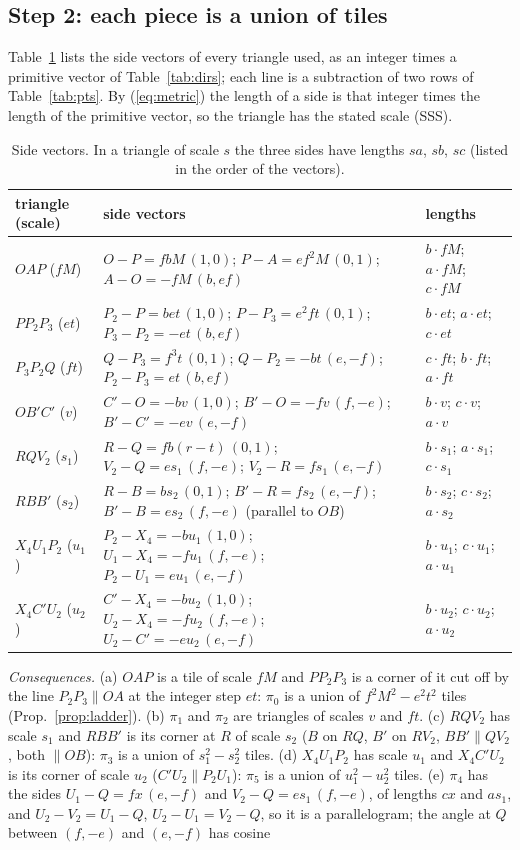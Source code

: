 \documentclass[11pt,reqno]{amsart}
\theoremstyle{plain}
\theoremstyle{definition}
\begin{document}
\subsection{Step 2: each piece is a union of tiles}\label{sub:shapes}
Table~\ref{tab:sides} lists the side vectors of every triangle used, as an integer times a primitive vector of Table~\ref{tab:dirs}; each line is a subtraction of two rows of Table~\ref{tab:pts}. By (\ref{eq:metric}) the length of a side is that integer times the length of the primitive vector, so the triangle has the stated scale (SSS).
\begin{table}[ht]
\centering\small
\caption{Side vectors. In a triangle of scale $s$ the three sides have lengths $sa$, $sb$, $sc$ (listed in the order of the vectors).}\label{tab:sides}
\begin{tabular}{@{}p{2.6cm}p{7.3cm}p{2.6cm}@{}}
\toprule
triangle (scale) & side vectors & lengths\\
\midrule
$OAP$ ($fM$) & $O-P=fbM\,(1,0)$; $P-A=ef^2M\,(0,1)$; $A-O=-fM\,(b,ef)$ & $b\!\cdot\! fM$; $a\!\cdot\! fM$; $c\!\cdot\! fM$\\
$PP_2P_3$ ($et$) & $P_2-P=bet\,(1,0)$; $P-P_3=e^2ft\,(0,1)$; $P_3-P_2=-et\,(b,ef)$ & $b\!\cdot\! et$; $a\!\cdot\! et$; $c\!\cdot\! et$\\
$P_3P_2Q$ ($ft$) & $Q-P_3=f^3t\,(0,1)$; $Q-P_2=-bt\,(e,-f)$; $P_2-P_3=et\,(b,ef)$ & $c\!\cdot\! ft$; $b\!\cdot\! ft$; $a\!\cdot\! ft$\\
$OB'C'$ ($v$) & $C'-O=-bv\,(1,0)$; $B'-O=-fv\,(f,-e)$; $B'-C'=-ev\,(e,-f)$ & $b\!\cdot\! v$; $c\!\cdot\! v$; $a\!\cdot\! v$\\
$RQV_2$ ($s_1$) & $R-Q=fb(r-t)\,(0,1)$; $V_2-Q=es_1\,(f,-e)$; $V_2-R=fs_1\,(e,-f)$ & $b\!\cdot\! s_1$; $a\!\cdot\! s_1$; $c\!\cdot\! s_1$\\
$RBB'$ ($s_2$) & $R-B=bs_2\,(0,1)$; $B'-R=fs_2\,(e,-f)$; $B'-B=es_2\,(f,-e)$ (parallel to $OB$) & $b\!\cdot\! s_2$; $c\!\cdot\! s_2$; $a\!\cdot\! s_2$\\
$X_4U_1P_2$ ($u_1$) & $P_2-X_4=-bu_1\,(1,0)$; $U_1-X_4=-fu_1\,(f,-e)$; $P_2-U_1=eu_1\,(e,-f)$ & $b\!\cdot\! u_1$; $c\!\cdot\! u_1$; $a\!\cdot\! u_1$\\
$X_4C'U_2$ ($u_2$) & $C'-X_4=-bu_2\,(1,0)$; $U_2-X_4=-fu_2\,(f,-e)$; $U_2-C'=-eu_2\,(e,-f)$ & $b\!\cdot\! u_2$; $c\!\cdot\! u_2$; $a\!\cdot\! u_2$\\
\bottomrule
\end{tabular}
\end{table}
\emph{Consequences.} (a) $OAP$ is a tile of scale $fM$ and $PP_2P_3$ is a corner of it cut off by the line $P_2P_3\parallel OA$ at the integer step $et$: $\pi_0$ is a union of $f^2M^2-e^2t^2$ tiles (Prop.~\ref{prop:ladder}). (b) $\pi_1$ and $\pi_2$ are triangles of scales $v$ and $ft$. (c) $RQV_2$ has scale $s_1$ and $RBB'$ is its corner at $R$ of scale $s_2$ ($B$ on $RQ$, $B'$ on $RV_2$, $BB'\parallel QV_2$, both $\parallel OB$): $\pi_3$ is a union of $s_1^2-s_2^2$ tiles. (d) $X_4U_1P_2$ has scale $u_1$ and $X_4C'U_2$ is its corner of scale $u_2$ ($C'U_2\parallel P_2U_1$): $\pi_5$ is a union of $u_1^2-u_2^2$ tiles. (e) $\pi_4$ has the sides $U_1-Q=fx\,(e,-f)$ and $V_2-Q=es_1\,(f,-e)$, of lengths $cx$ and $as_1$, and $U_2-V_2=U_1-Q$, $U_2-U_1=V_2-Q$, so it is a parallelogram; the angle at $Q$ between $(f,-e)$ and $(e,-f)$ has cosine
\end{document}
